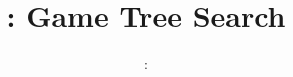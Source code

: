 \usepackage{../../beamerthemeFalmouthGamesAcademy}
\usepackage{multimedia}
\graphicspath{ {../../} }

\usepackage[T1]{fontenc}

\renewcommand{\pounds}{\text{\textsterling}}


\usepackage[normalem]{ulem}
\usepackage{wasysym}

\usepackage[noend]{algpseudocode}
\usepackage{pdfpages}

\usetikzlibrary{arrows,automata}




\title{\sessionnumber: Game Tree Search}
\subtitle{\modulecode: \moduletitle}

\frame{\titlepage} 







%


